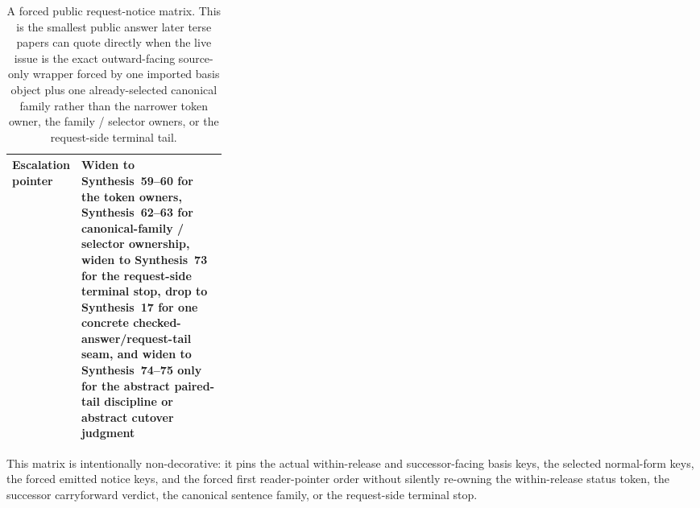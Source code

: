 \documentclass[11pt]{article}
\begin{document}
\begin{table}[t]
\begin{tabularx}{0.97\linewidth}{@{}p{0.31\linewidth}X@{}}
Escalation pointer & Widen to Synthesis~59--60 for the token owners, Synthesis~62--63 for canonical-family / selector ownership, widen to Synthesis~73 for the request-side terminal stop, drop to Synthesis~17 for one concrete checked-answer/request-tail seam, and widen to Synthesis~74--75 only for the abstract paired-tail discipline or abstract cutover judgment \\
\bottomrule
\end{tabularx}
\caption{A forced public request-notice matrix. This is the smallest public answer later terse papers can quote directly when the live issue is the exact outward-facing source-only wrapper forced by one imported basis object plus one already-selected canonical family rather than the narrower token owner, the family / selector owners, or the request-side terminal tail.}
\label{tab:forced-public-request-notice-matrix}
\end{table}

This matrix is intentionally non-decorative: it pins the actual within-release and successor-facing basis keys, the selected normal-form keys, the forced emitted notice keys, and the forced first reader-pointer order without silently re-owning the within-release status token, the successor carryforward verdict, the canonical sentence family, or the request-side terminal stop.\cite{series:workedexample}
\end{document}

